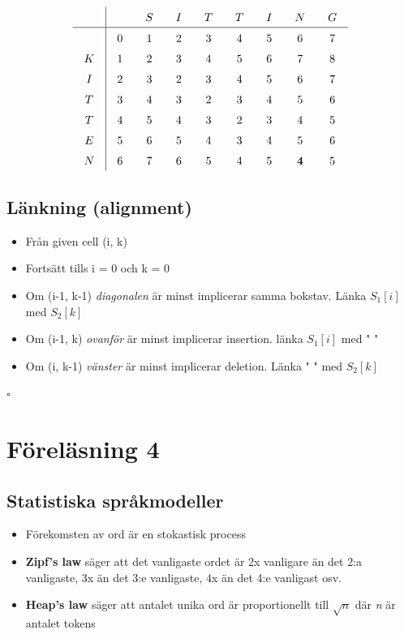 \documentclass[12pt,a4paper]{article}
\begin{document}
\[
\renewcommand{\arraystretch}{1.5} %
\setlength{\arraycolsep}{1em}     %
\begin{array}{c|cccccccc}
      & & S & I & T & T & I & N & G \\
    \hline
     & 0 & 1 & 2 & 3 & 4 & 5 & 6 & 7 \\
    K & 1 & 2 & 3 & 4 & 5 & 6 & 7 & 8 \\
    I & 2 & 3 & 2 & 3 & 4 & 5 & 6 & 7 \\
    T & 3 & 4 & 3 & 2 & 3 & 4 & 5 & 6 \\
    T & 4 & 5 & 4 & 3 & 2 & 3 & 4 & 5 \\
    E & 5 & 6 & 5 & 4 & 3 & 4 & 5 & 6 \\
    N & 6 & 7 & 6 & 5 & 4 & 5 & \mathbf{4} & 5 \\
\end{array}
\]

\noindent\hrulefill

\subsection*{Länkning (alignment)}
\begin{itemize}
    \item Från given cell (i, k)
    \item Fortsätt tills i = 0 och k = 0
    \item Om (i-1, k-1) \textit{diagonalen} är minst implicerar samma bokstav. Länka $S_1[i]$ med $S_2[k]$ 
    \item Om (i-1, k) \textit{ovanför} är minst implicerar insertion. länka $S_1[i]$ med " "
    \item Om (i, k-1) \textit{vänster} är minst implicerar deletion. Länka " " med $S_2[k]$   
\end{itemize}

\noindent\hrulefill
\newline
\newline
{\Huge $\square$}

\newpage

\section*{Föreläsning 4}
\subsection*{Statistiska språkmodeller}
\begin{itemize}
    \item Förekomsten av ord är en stokastisk process
    \item \textbf{Zipf's law} säger att det vanligaste ordet är 2x vanligare än det 2:a vanligaste, 3x än det 3:e vanligaste, 4x än det 4:e vanligast osv. 
    \item \textbf{Heap's law} säger att antalet unika ord är proportionellt till $\sqrt{n}$ där \textit{n} är antalet tokens
\end{itemize}
\end{document}
